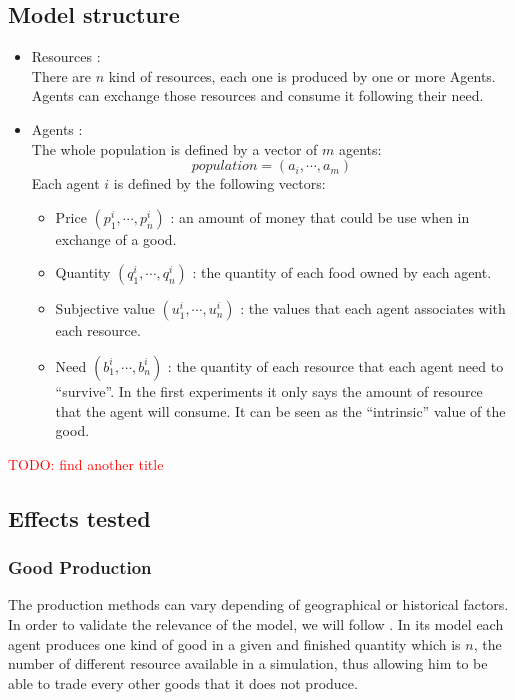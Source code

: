 \documentclass{wscpaperproc}
\newcommand{\memo}[2]{\textcolor{#1}{#2}}
\newcommand{\todo}[1]{\memo{red}{TODO: #1\\}}
\begin{document}
\subsection{Model structure} 
\begin{itemize}
	\item Resources :\\
		There are $n$ kind of resources, each one is produced by one or more Agents. Agents can exchange those resources and consume it following their need.
	\item  Agents :\\
		The whole population is defined by a vector of $m$ agents: 
		$$ population= (a_i, \cdots ,a_m) $$
		Each agent $i$ is defined by the following vectors:
		\begin{itemize}
			\item Price $(p^i_1,\cdots,p^i_n)$ : an amount of money that could be use when in exchange of a good.
			\item Quantity $(q^i_1,\cdots,q^i_n)$ : the quantity of each food owned by each agent.
			\item Subjective value $(u^i_1,\cdots,u^i_n)$ : the values that each agent associates with each resource.
			\item Need $(b^i_1, \cdots, b^i_n)$ :  the quantity of each resource that each agent need to ``survive''. In the first experiments it only says the amount of resource that the agent will consume. It can be seen as the ``intrinsic'' value of the good.
		\end{itemize}
\end{itemize}

\todo{find another title}
\subsection{Effects tested}

\subsubsection{Good Production}\label{production}
The production methods can vary depending of geographical or historical factors. In order to validate the relevance of the model, we will follow \cite{gintis_emergence_2006}. In its model each agent produces one kind of good in a given and finished quantity which is $n$, the number of different resource available in a simulation, thus allowing him to be able to trade every other goods that it does not produce.
\end{document}
